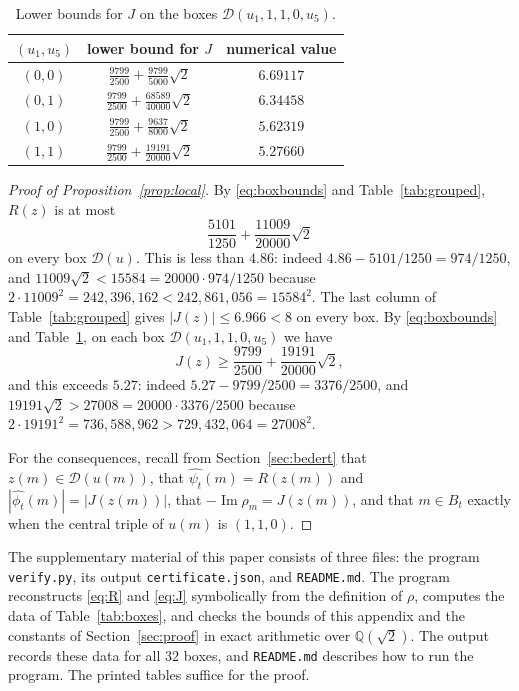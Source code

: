 \documentclass{amsart}
\theoremstyle{remark}
\numberwithin{equation}{section}
\numberwithin{table}{section}
\newcommand{\D}{\mathcal{D}}
\DeclareMathOperator{\im}{Im}
\begin{document}
\begin{table}[H]
\caption{Lower bounds for $J$ on the boxes $\D(u_1,1,1,0,u_5)$.}\label{tab:boundary}
\small
\renewcommand{\arraystretch}{1.2}
\begin{tabular}{@{}ccc@{}}
\toprule
$(u_1,u_5)$ & lower bound for $J$ & numerical value\\
\midrule
$(0,0)$ & $\tfrac{9799}{2500}+\tfrac{9799}{5000}\sqrt2$ & $6.69117$\\
$(0,1)$ & $\tfrac{9799}{2500}+\tfrac{68589}{40000}\sqrt2$ & $6.34458$\\
$(1,0)$ & $\tfrac{9799}{2500}+\tfrac{9637}{8000}\sqrt2$ & $5.62319$\\
$(1,1)$ & $\tfrac{9799}{2500}+\tfrac{19191}{20000}\sqrt2$ & $5.27660$\\
\bottomrule
\end{tabular}
\end{table}

\begin{proof}[Proof of Proposition~\ref{prop:local}]
By \eqref{eq:boxbounds} and Table~\ref{tab:grouped}, $R(z)$ is at most
\[
\frac{5101}{1250}+\frac{11009}{20000}\sqrt2
\]
on every box $\D(u)$. This is less than $4.86$: indeed $4.86-5101/1250=974/1250$, and $11009\sqrt2<15584=20000\cdot974/1250$ because $2\cdot11009^2=242{,}396{,}162<242{,}861{,}056=15584^2$. The last column of Table~\ref{tab:grouped} gives $|J(z)|\le6.966<8$ on every box. By \eqref{eq:boxbounds} and Table~\ref{tab:boundary}, on each box $\D(u_1,1,1,0,u_5)$ we have
\[
J(z)\ge\frac{9799}{2500}+\frac{19191}{20000}\sqrt2,
\]
and this exceeds $5.27$: indeed $5.27-9799/2500=3376/2500$, and $19191\sqrt2>27008=20000\cdot3376/2500$ because $2\cdot19191^2=736{,}588{,}962>729{,}432{,}064=27008^2$.

For the consequences, recall from Section~\ref{sec:bedert} that $z(m)\in\D(u(m))$, that $\widehat{\psi_t}(m)=R(z(m))$ and $|\widehat{\phi_t}(m)|=|J(z(m))|$, that $-\im\rho_m=J(z(m))$, and that $m\in B_t$ exactly when the central triple of $u(m)$ is $(1,1,0)$.
\end{proof}

{\sloppy The supplementary material of this paper consists of three files: the program \texttt{verify.py}, its output \texttt{certificate.json}, and \texttt{README.md}. The program reconstructs \eqref{eq:R} and \eqref{eq:J} symbolically from the definition of $\rho$, computes the data of Table~\ref{tab:boxes}, and checks the bounds of this appendix and the constants of Section~\ref{sec:proof} in exact arithmetic over $\mathbb Q(\sqrt2)$. The output records these data for all $32$ boxes, and \texttt{README.md} describes how to run the program. The printed tables suffice for the proof.\par}
\end{document}
